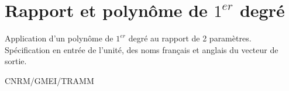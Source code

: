 %
\section{Rapport et polyn\^ome de $1^{er}$ degr\'e }

 
\label{OP-Poly1_XsurY_flt}

Application d'un polyn\^ome de $1^{er}$ degr\'e 
au rapport de 2 param\`etres.\\
Sp\'ecification en entr\'ee de l'unit\'e, des noms fran\c cais et
anglais du vecteur de sortie.

\bigskip





%

CNRM/GMEI/TRAMM

